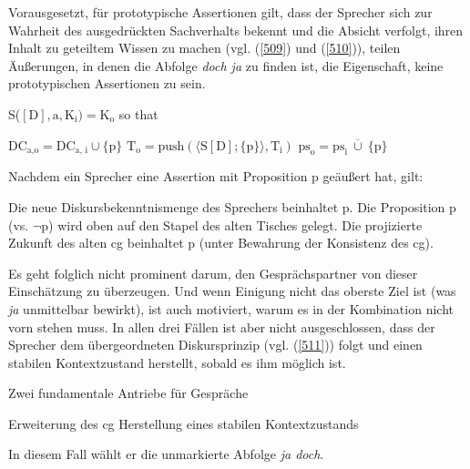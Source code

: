 Vorausgesetzt, für prototypische Assertionen gilt, dass der Sprecher sich zur Wahrheit des ausgedrückten Sachverhalts bekennt und die Absicht verfolgt, ihren Inhalt zu geteiltem Wissen zu machen (vgl. (\ref{509}) und (\ref{510})), teilen Äußerungen, in denen die Abfolge \textit{doch ja} zu finden ist, die Eigenschaft, keine prototypischen Assertionen zu sein.

\begin{exe}
	\ex\label{509} 
		S($[\textrm{D}], \textrm{a}, \textrm{K}_{\textrm{i}}) = \textrm{K}_{\textrm{o}}$ so that
		\begin{xlist}	
			\ex\label{509a} $\textrm{DC}_{\textrm{a,o}} = \textrm{DC}_{\textrm{a, i}} \cup \lbrace\textrm{p}\rbrace$
			\ex\label{509b} $\textrm{T}_{\textrm{o}} = \textrm{push}(\langle \textrm{S}[\textrm{D}]; \lbrace \textrm{p} \rbrace \rangle, \textrm{T}_{\textrm{i}})$
			\ex\label{509c} $\textrm{ps}_{\textrm{o}} = \textrm{ps}_{\textrm{i}} \ \overline\cup \ \lbrace \textrm{p} \rbrace$
			\hfill\hbox {\citet[92]{Farkas2010}}
		\end{xlist}
\end{exe}

\begin{exe}
	\ex\label{510} 
	Nachdem ein Sprecher eine Assertion mit Proposition p geäußert hat, gilt:
		\begin{xlist}	
			\ex\label{510a} Die neue Diskursbekenntnismenge des Sprechers beinhaltet p.
			\ex\label{510b} Die Proposition p (vs. $\neg$p) wird oben auf den Stapel des alten Tisches gelegt.
			\ex\label{510c} Die projizierte Zukunft des alten cg beinhaltet p (unter Bewahrung der Konsistenz des cg).
		\end{xlist}
\end{exe}
Es geht folglich nicht prominent darum, den Gesprächspartner von dieser Einschätzung zu überzeugen. Und wenn Einigung nicht das oberste Ziel ist (was \textit{ja} unmittelbar bewirkt), ist auch motiviert, warum es in der Kombination nicht vorn stehen muss. In allen drei Fällen ist aber nicht ausgeschlossen, dass der Sprecher dem übergeordneten Diskursprinzip (vgl. (\ref{511})) folgt und einen stabilen Kontextzustand herstellt, sobald es ihm möglich ist. 

\begin{exe}
	\ex\label{511} Zwei fundamentale Antriebe für Gespräche
		\begin{xlist}	
			\ex\label{511a} Erweiterung des cg
			\ex\label{511b} Herstellung eines stabilen Kontextzustands
			\hfill\hbox {\citet[87]{Farkas2010}}
		\end{xlist}
\end{exe}
In diesem Fall wählt er die unmarkierte Abfolge \textit{ja doch}.
								         
